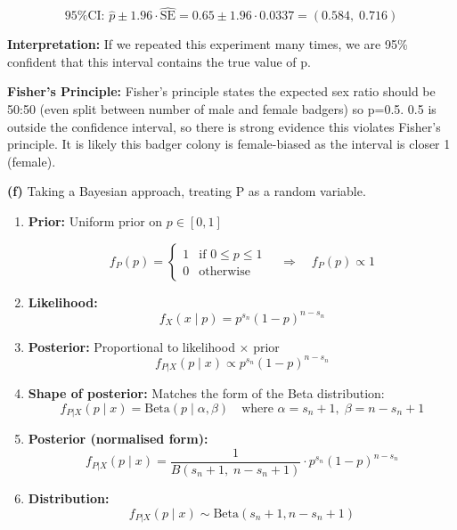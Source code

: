 \documentclass[12pt]{article}
\begin{document}
\[
\text{95\% CI: } \hat{p} \pm 1.96 \cdot \widehat{\text{SE}} = 0.65 \pm 1.96 \cdot 0.0337 
= \boxed{(0.584, \; 0.716)}
\]


\noindent\textbf{Interpretation:}  
If we repeated this experiment many times, we are 95\% confident that this interval contains the true value of p. 

\vspace{1em}

\noindent\textbf{Fisher’s Principle:}  
Fisher's principle states the expected sex ratio should be 50:50 (even split between number of male and female badgers) so p=0.5. 0.5 is outside the confidence interval, so there is strong evidence this violates Fisher's principle. It is likely this badger colony is female-biased as the interval is closer 1 (female).

\vspace{1em}

\noindent\textbf{(f)} Taking a Bayesian approach, treating P as a random variable.

\begin{enumerate}[label=\textbf{\arabic*.}]
    \item \textbf{Prior:} Uniform prior on \( p \in [0, 1] \)

    \[
    f_P(p) =
    \begin{cases}
    1 & \text{if } 0 \leq p \leq 1 \\
    0 & \text{otherwise}
    \end{cases}
    \quad \Rightarrow \quad f_P(p) \propto 1
    \]

    \item \textbf{Likelihood:}
    \[
    f_X(x \mid p) = p^{s_n}(1 - p)^{n - s_n}
    \]

    \item \textbf{Posterior:} Proportional to likelihood × prior
    \[
    f_{P|X}(p \mid x) \propto p^{s_n}(1 - p)^{n - s_n}
    \]

    \item \textbf{Shape of posterior:} Matches the form of the Beta distribution:
    \[
    f_{P|X}(p \mid x) = \text{Beta}(p \mid \alpha, \beta) \quad \text{where } \alpha = s_n + 1,\; \beta = n - s_n + 1
    \]

    \item \textbf{Posterior (normalised form):}
    \[
    \boxed{
    f_{P|X}(p \mid x) = \frac{1}{B(s_n + 1,\; n - s_n + 1)} \cdot p^{s_n}(1 - p)^{n - s_n}
    }
    \]

    \item \textbf{Distribution:}
    \[
    f_{P|X}(p \mid x) \sim \text{Beta}(s_n + 1, n - s_n + 1)
    \]

\end{enumerate}
\end{document}
